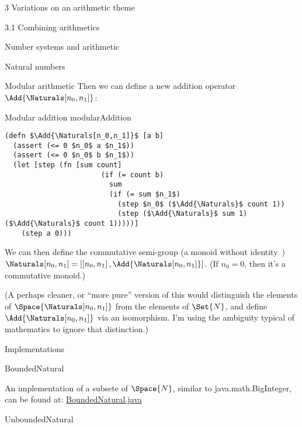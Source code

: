 \documentclass[12pt]{PalisadesLakesBook}
\begin{document}
\begin{plSection}{3 Variations on an arithmetic theme}
\begin{plSection}{3.1 Combining arithmetics}
\begin{plSection}{Number systems and arithmetic}
\begin{plSection}{Natural numbers}
\begin{plSection}{Modular arithmetic}
Then we can define a new addition operator 
$\Add{ \Naturals[n_0,n_1] }$:
\begin{plAlgorithm}
{Modular addition}
{modularAddition}
\begin{lstlisting}[language=pseudocode]
(defn $\Add{\Naturals[n_0,n_1]}$ [a b]
  (assert (<= 0 $n_0$ a $n_1$))
  (assert (<= 0 $n_0$ b $n_1$))
  (let [step (fn [sum count]
                       (if (= count b)
                         sum
                         (if (= sum $n_1$)
                           (step $n_0$ ($\Add{\Naturals}$ count 1))
                           (step ($\Add{\Naturals}$ sum 1) ($\Add{\Naturals}$ count 1)))))]
    (step a 0)))
\end{lstlisting}
\end{plAlgorithm}

We can then define the commutative semi-group 
(a monoid without identity~\cite{wiki:Semigroup})
$
\Naturals[n_0,n_1] =
\left[ 
\left[ n_{0}, n_{1} \right], 
\Add{\Naturals[n_0,n_1]}
\right]
$.
(If $n_0=0$, then it's a commutative monoid.)

(A perhaps cleaner, or ``more pure'' version of this
would distinguish the elements of $\Space{\Naturals[n_0,n_1]}$
from the elements of $\Set{N}$,
and define $\Add{\Naturals[n_0,n_1]}$ via an isomorphism.
I'm using the ambiguity typical of mathematics to ignore that
distinction.)

\end{plSection}%
\begin{plSection}{Implementations}



\begin{plSection}{\javaFont BoundedNatural}

An implementation of a subsete of $\Space{N}$,
similar to {\javaFont java.math.BigInteger},
can be found at: 
\href{https://github.com/palisades-lakes/sicpplus/blob/main/src/main/java/sicpplus/java/numbers/BoundedNatural.java}
{\javaFont BoundedNatural.java}

\end{plSection}%
\begin{plSection}{\javaFont UnboundedNatural}


\end{plSection}
\end{plSection}
\end{plSection}
\end{plSection}
\end{plSection}
\end{plSection}
\end{document}
